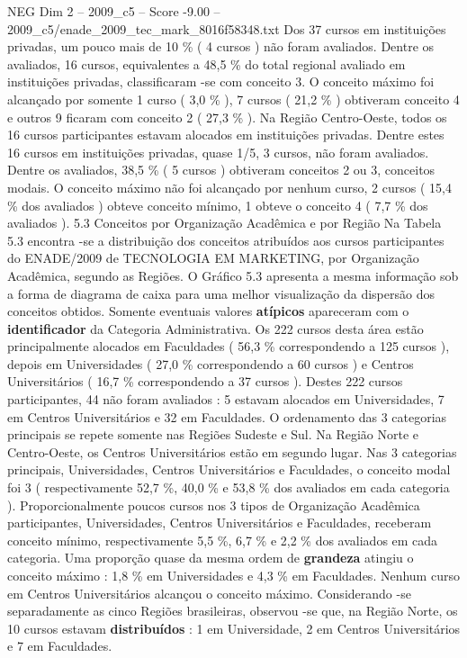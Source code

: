 \begin{textsample}{NEG Dim 2 – 2009\_c5 – Score -9.00 – 2009\_c5/enade\_2009\_tec\_mark\_8016f58348.txt}
Dos 37 cursos em instituições privadas, um pouco mais de 10 \% ( 4 cursos ) não foram avaliados.
Dentre os avaliados, 16 cursos, equivalentes a 48,5 \% do total regional avaliado em instituições privadas, classificaram -se com conceito 3.
O conceito máximo foi alcançado por somente 1 curso ( 3,0 \% ), 7 cursos ( 21,2 \% ) obtiveram conceito 4 e outros 9 ficaram com conceito 2 ( 27,3 \% ).
Na Região Centro-Oeste, todos os 16 cursos participantes estavam alocados em instituições privadas.
Dentre estes 16 cursos em instituições privadas, quase 1/5, 3 cursos, não foram avaliados.
Dentre os avaliados, 38,5 \% ( 5 cursos ) obtiveram conceitos 2 ou 3, conceitos modais.
O conceito máximo não foi alcançado por nenhum curso, 2 cursos ( 15,4 \% dos avaliados ) obteve conceito mínimo, 1 obteve o conceito 4 ( 7,7 \% dos avaliados ). 5.3 Conceitos por Organização Acadêmica e por Região Na Tabela 5.3 encontra -se a distribuição dos conceitos atribuídos aos cursos participantes do ENADE/2009 de TECNOLOGIA EM MARKETING, por Organização Acadêmica, segundo as Regiões.
O Gráfico 5.3 apresenta a mesma informação sob a forma de diagrama de caixa para uma melhor visualização da dispersão dos conceitos obtidos.
Somente eventuais valores \textbf{atípicos} apareceram com o \textbf{identificador} da Categoria Administrativa.
Os 222 cursos desta área estão principalmente alocados em Faculdades ( 56,3 \% correspondendo a 125 cursos ), depois em Universidades ( 27,0 \% correspondendo a 60 cursos ) e Centros Universitários ( 16,7 \% correspondendo a 37 cursos ).
Destes 222 cursos participantes, 44 não foram avaliados : 5 estavam alocados em Universidades, 7 em Centros Universitários e 32 em Faculdades.
O ordenamento das 3 categorias principais se repete somente nas Regiões Sudeste e Sul.
Na Região Norte e Centro-Oeste, os Centros Universitários estão em segundo lugar.
Nas 3 categorias principais, Universidades, Centros Universitários e Faculdades, o conceito modal foi 3 ( respectivamente 52,7 \%, 40,0 \% e 53,8 \% dos avaliados em cada categoria ).
Proporcionalmente poucos cursos nos 3 tipos de Organização Acadêmica participantes, Universidades, Centros Universitários e Faculdades, receberam conceito mínimo, respectivamente 5,5 \%, 6,7 \% e 2,2 \% dos avaliados em cada categoria.
Uma proporção quase da mesma ordem de \textbf{grandeza} atingiu o conceito máximo : 1,8 \% em Universidades e 4,3 \% em Faculdades.
Nenhum curso em Centros Universitários alcançou o conceito máximo.
Considerando -se separadamente as cinco Regiões brasileiras, observou -se que, na Região Norte, os 10 cursos estavam \textbf{distribuídos} : 1 em Universidade, 2 em Centros Universitários e 7 em Faculdades.

\end{textsample}
